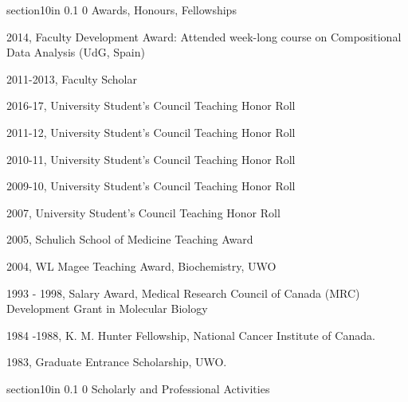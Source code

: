 \documentclass[11pt]{article}
\makeatletter
\renewcommand\section{\@startsection
	{section}{1}{0in}%
	{0.1\baselineskip}%
	{0\baselineskip}%
	{\sffamily\bfseries\large}
}
\makeatother
\begin{document}
\section{Awards, Honours, Fellowships}
\begin{description}\itemsep=2pt
\item 2014,       Faculty Development Award: Attended week-long course on Compositional Data Analysis (UdG, Spain)
\item 2011-2013,       Faculty Scholar
\item 2016-17,		University Student's Council Teaching Honor Roll
\item 2011-12,		University Student's Council Teaching Honor Roll
\item 2010-11,		University Student's Council Teaching Honor Roll
\item 2009-10,		University Student's Council Teaching Honor Roll
\item 2007,		University Student's Council Teaching Honor Roll
\item 2005,		Schulich School of Medicine Teaching Award
\item 2004,		WL Magee Teaching Award, Biochemistry, UWO
\item 1993 - 1998,	Salary Award, Medical Research Council of Canada (MRC)\\ Development Grant in Molecular Biology
\item 1984 -1988, 	K. M. Hunter Fellowship, National Cancer Institute of Canada.
\item 1983,	       	Graduate Entrance Scholarship, UWO.
\end{description}


\section{Scholarly and Professional Activities}
\end{document}
